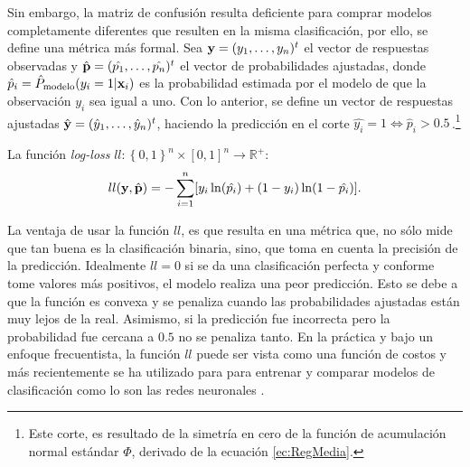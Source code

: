 \documentclass[../Main/Main.tex]{subfiles}
\begin{document}
Sin embargo, la matriz de confusión resulta deficiente para comprar modelos completamente diferentes que resulten en la misma clasificación, por ello, se define una métrica más formal. Sea $\mathbf{y} = (y_1,\ldots,y_n)^t$ el vector de respuestas observadas y \linebreak $\hat{\mathbf{p}} = (\hat{p_1},\ldots,\hat{p_n})^t$ el vector de probabilidades ajustadas, donde $\hat{p}_i = \hat{P}_{\text{modelo}}(y_i = 1|\mathbf{x}_i)$ es la probabilidad estimada por el modelo de que la observación $y_i$ sea igual a uno. Con lo anterior, se define un vector de respuestas ajustadas $\hat{\mathbf{y}} = (\hat{y}_1,\ldots,\hat{y}_n)^t$, haciendo la predicción en el corte $\hat{y_i} = 1 \iff \hat{p}_i > 0.5\,$.\footnote{Este corte, es resultado de la simetría en cero de la función de acumulación normal estándar $\Phi$, derivado de la ecuación \eqref{ec:RegMedia}.}
\begin{definition}
La función \textit{log-loss} $ll:\left\{0,1\right\}^n\times[0,1]^n\rightarrow \mathbb{R}^+$:
\begin{align}
	ll(\mathbf{y},\hat{\mathbf{p}}) = -\sum_{i = 1}^n[ y_i \ln(\hat{p_i}) + (1-y_i)\ln(1-\hat{p_i})]. \label{ec:LogLoss}
\end{align}
\end{definition}
La ventaja de usar la función $ll$, es que resulta en una métrica que, no sólo mide que tan buena es la clasificación binaria, sino, que toma en cuenta la precisión de la predicción. Idealmente $ll = 0$ si se da una clasificación perfecta y conforme tome valores más positivos, el modelo realiza una peor predicción. Esto se debe a que la función es convexa y se penaliza cuando las probabilidades ajustadas están muy lejos de la real. Asimismo, si la predicción fue incorrecta pero la probabilidad fue cercana a $0.5$ no se penaliza tanto.  En la práctica y bajo un enfoque frecuentista, la función $ll$ puede ser vista como una función de costos y más recientemente se ha utilizado para para entrenar y comparar modelos de clasificación como lo son las redes neuronales \autocite{nielsen2015neural}.
\end{document}
